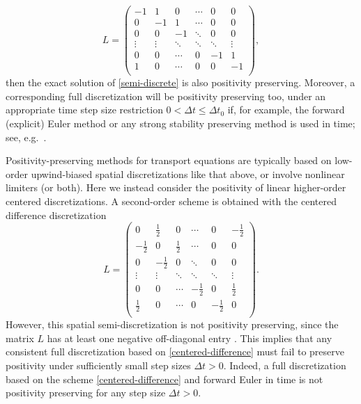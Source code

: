 \documentclass[a4paper]{article}
\newcommand{\dt}{\Delta t}
\begin{document}
\begin{equation}\label{upwind1}
L=\left(
\begin{array}{cccccc}
 -1 & 1 & 0  & \cdots & 0 & 0 \\
 0 & -1 & 1 &  \cdots & 0 & 0 \\
 0 & 0 & -1 &  \ddots & 0 & 0\\
 \vdots  & \vdots  & \ddots  & \ddots & \ddots & \vdots \\
  0 & 0 & \cdots  & 0 & -1 & 1 \\
 1 & 0 & \cdots & 0 & 0 & -1 \\
\end{array}
\right),
\end{equation}
then the exact solution of \eqref{semi-discrete} is also positivity
preserving. Moreover, a corresponding full discretization will be positivity preserving too,
under an appropriate time step size restriction $0<\dt\le\dt_0$
if, for example, the forward (explicit) Euler method or any strong stability preserving
method \cite{SSPbook} is used in time; see, e.g.~\cite{posconv}.  

Positivity-preserving methods for transport equations are typically based
on low-order upwind-biased spatial discretizations like that above, or involve
nonlinear limiters (or both).
Here we instead consider the positivity of linear higher-order centered discretizations.
A second-order scheme is obtained with the centered difference discretization
\begin{equation}\label{centered-difference}
L=\left(
\begin{array}{cccccc}
 0 & \frac{1}{2} & 0  & \cdots & 0 & -\frac{1}{2} \\
 -\frac{1}{2} & 0 & \frac{1}{2} &  \cdots & 0 & 0 \\
 0 & -\frac{1}{2} & 0 &  \ddots & 0 & 0\\
 \vdots  & \vdots  & \ddots  & \ddots & \ddots & \vdots \\
  0 & 0 & \cdots  & -\frac{1}{2} & 0 & \frac{1}{2} \\
 \frac{1}{2} & 0 & \cdots & 0 & -\frac{1}{2} & 0 \\
\end{array}
\right).
\end{equation}
However, this spatial semi-discretization is not positivity preserving, since the
matrix $L$ has at least one negative off-diagonal entry \cite[Chapter I,
Theorem 7.2]{hundsdorferverwer}.
This implies that any consistent full discretization based on \eqref{centered-difference}
must fail to preserve positivity under sufficiently small step sizes $\dt>0$.
Indeed, a full discretization based on the scheme \eqref{centered-difference}
and forward Euler in time is not positivity preserving for any step size $\dt>0$.
\end{document}
